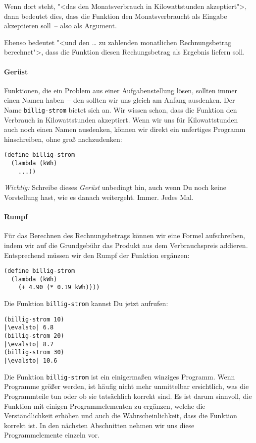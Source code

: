 Wenn dort steht, "<das den Monatsverbrauch in Kilowattstunden
akzeptiert">, dann bedeutet dies, dass die Funktion den
Monatsverbraucht als Eingabe akzeptieren soll~-- also als Argument.

Ebenso bedeutet "<und den \ldots{} zu zahlenden monatlichen
Rechnungsbetrag berechnet">, dass die Funktion diesen Rechungsbetrag
als Ergebnis liefern soll.

\paragraph{Gerüst}

Funktionen, die ein Problem aus einer Aufgabenstellung lösen, sollten immer
einen Namen haben~-- den sollten wir uns gleich am Anfang ausdenken. Der Name
\lstinline{billig-strom} bietet sich an. Wir wissen schon, dass die Funktion
den Verbrauch in Kilowattstunden akzeptiert. Wenn wir uns für Kilowattstunden
auch noch einen Namen ausdenken, können wir direkt ein unfertiges Programm
hinschreiben, ohne groß nachzudenken:
%
\begin{lstlisting}
(define billig-strom
  (lambda (kWh)
    ...))
\end{lstlisting}
%
\emph{Wichtig:} Schreibe dieses \textit{Gerüst}
unbedingt hin, auch wenn Du noch keine Vorstellung hast, wie es danach
weitergeht.  Immer.  Jedes Mal.

\paragraph{Rumpf}

Für das Berechnen des Rechnungsbetrags können wir eine Formel
aufschreiben, indem wir auf die Grundgebühr das Produkt aus dem
Verbrauchspreis addieren.  Entsprechend müssen wir den Rumpf der
Funktion ergänzen:
%
\begin{lstlisting}
(define billig-strom
  (lambda (kWh)
    (+ 4.90 (* 0.19 kWh))))
\end{lstlisting}
%
Die Funktion \lstinline{billig-strom} kannst Du jetzt aufrufen:
%
\begin{lstlisting}
(billig-strom 10)
|\evalsto| 6.8
(billig-strom 20)
|\evalsto| 8.7
(billig-strom 30)
|\evalsto| 10.6
\end{lstlisting}
%
Die Funktion \lstinline{billig-strom} ist ein einigermaßen winziges
Programm.  Wenn Programme größer werden, ist häufig nicht mehr
unmittelbar ersichtlich, was die Programmteile tun oder ob sie
tatsächlich korrekt sind.  Es ist darum sinnvoll, die Funktion mit
einigen Programmelementen zu ergänzen, welche die Verständlichkeit
erhöhen und auch die Wahrscheinlichkeit, dass die Funktion korrekt
ist.  In den nächsten Abschnitten nehmen wir uns diese
Programmelemente einzeln vor.

